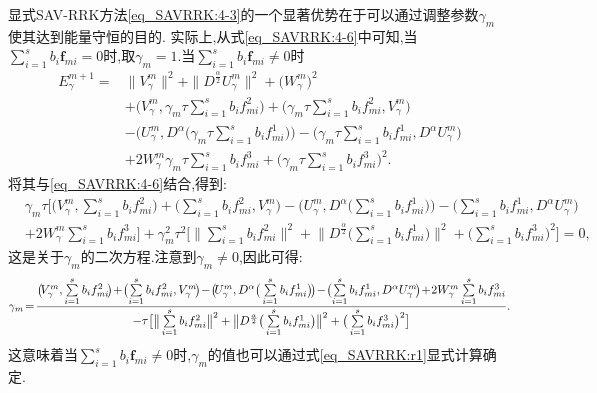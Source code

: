 显式SAV-RRK方法\eqref{eq_SAVRRK:4-3}的一个显著优势在于可以通过调整参数$\gamma_m$ 使其达到能量守恒的目的.
实际上,从式\eqref{eq_SAVRRK:4-6}中可知,当$\sum\limits_{i=1}^s b_i \bm{f}_{m i}=0$时,取$\gamma_m=1$.当$\sum\limits_{i=1}^s b_i \bm{f}_{m i}\neq 0$时%
\begin{align}
E_{\gamma}^{m+1}  = & \|V_{\gamma}^{m}\|^2+\|D^\frac{\alpha}{2} U_{\gamma}^{m}\|^2+\big(W_{\gamma}^{m}\big)^2 \nonumber\\
& + \big(V_{\gamma}^{m},\gamma_m\tau\sum\limits_{i=1}^{s}b_if_{mi}^2\big)+\big(\gamma_m\tau\sum\limits_{i=1}^{s}b_if_{mi}^2,V_{\gamma}^{m}\big)\nonumber\\
&-\big(U_{\gamma}^{m}, D^{\alpha}\big(\gamma_m\tau\sum\limits_{i=1}^{s}b_if_{mi}^1\big)\big)-\big(\gamma_m\tau\sum\limits_{i=1}^{s}b_if_{mi}^1, D^{\alpha} U_{\gamma}^{m}\big)\nonumber\\
&+2W_{\gamma}^{m}\gamma_m\tau\sum\limits_{i=1}^{s}b_if_{mi}^3+\big(\gamma_m\tau\sum\limits_{i=1}^{s}b_if_{mi}^3\big)^2.\label{eq_SAVRRK:49}
\end{align}
将其与\eqref{eq_SAVRRK:4-6}结合,得到:
\begin{align*}
&\gamma_m\tau\big[\big(V_{\gamma}^{m},\sum\limits_{i=1}^{s}b_if_{mi}^2\big)+\big(\sum\limits_{i=1}^{s}b_if_{mi}^2,V_{\gamma}^{m}\big)-\big(U_{\gamma}^{m},D^{\alpha}\big(\sum\limits_{i=1}^{s}b_if_{mi}^1\big)\big)-\big(\sum\limits_{i=1}^{s}b_if_{mi}^1, D^{\alpha} U_{\gamma}^{m}\big)\\
&+2W_{\gamma}^{m}\sum\limits_{i=1}^{s}b_if_{mi}^3\big] +\gamma_m^2\tau^2\big[\big\|\sum\limits_{i=1}^{s}b_if_{mi}^2\big\|^2+ \big\|D^\frac{\alpha}{2}\big(\sum\limits_{i=1}^{s}b_if_{mi}^1\big)\big\|^2+\big(\sum\limits_{i=1}^{s}b_if_{mi}^3\big)^2\big]=0,
\end{align*}
这是关于$\gamma_m$的二次方程.注意到$\gamma_m\neq 0$,因此可得:
\begin{equation}\label{eq_SAVRRK:r1}\small
\gamma_m \!=\! \frac{\big(\!V_{\gamma}^{m},\sum\limits_{i=1}^{s}b_if_{mi}^2\!\big)\!+\!\big(\!\sum\limits_{i=1}^{s}b_if_{mi}^2,V_{\gamma}^{m}\!\big)\!-\!\big(\!U_{\gamma}^{m},D^{\alpha}\big(\sum\limits_{i=1}^{s}b_if_{mi}^1\big)\!\big)\!-\!\big(\!\sum\limits_{i=1}^{s}b_if_{mi}^1, D^{\alpha} U_{\gamma}^{m}\!\big)\!+\!2W_{\gamma}^{m}\sum\limits_{i=1}^{s}b_if_{mi}^3}{-\tau\big[\big\|\sum\limits_{i=1}^{s}b_if_{mi}^2\big\|^2+\big\|D^\frac{\alpha}{2}\big(\sum\limits_{i=1}^{s}b_if_{mi}^1\big)\big\|^2+\big(\sum\limits_{i=1}^{s}b_if_{mi}^3\big)^2\big]} .
\end{equation}
这意味着当$\sum\limits_{i=1}^s b_i \bm{f}_{m i}\neq 0$时,$\gamma_m$的值也可以通过式\eqref{eq_SAVRRK:r1}显式计算确定.

